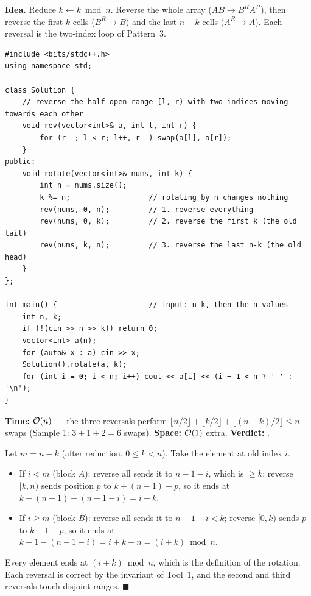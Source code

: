 \begin{algorithmbox}
\textbf{Idea.} Reduce $k \leftarrow k \bmod n$. Reverse the whole array ($AB \to B^R A^R$), then reverse the first $k$ cells ($B^R \to B$) and the last $n-k$ cells ($A^R \to A$). Each reversal is the two-index loop of Pattern~3.
\begin{lstlisting}[style=cpp]
#include <bits/stdc++.h>
using namespace std;

class Solution {
    // reverse the half-open range [l, r) with two indices moving towards each other
    void rev(vector<int>& a, int l, int r) {
        for (r--; l < r; l++, r--) swap(a[l], a[r]);
    }
public:
    void rotate(vector<int>& nums, int k) {
        int n = nums.size();
        k %= n;                  // rotating by n changes nothing
        rev(nums, 0, n);         // 1. reverse everything
        rev(nums, 0, k);         // 2. reverse the first k (the old tail)
        rev(nums, k, n);         // 3. reverse the last n-k (the old head)
    }
};

int main() {                     // input: n k, then the n values
    int n, k;
    if (!(cin >> n >> k)) return 0;
    vector<int> a(n);
    for (auto& x : a) cin >> x;
    Solution().rotate(a, k);
    for (int i = 0; i < n; i++) cout << a[i] << (i + 1 < n ? ' ' : '\n');
}
\end{lstlisting}
\begin{complexitybox}
\textbf{Time:} $\mathcal{O}(n)$ --- the three reversals perform $\lfloor n/2\rfloor + \lfloor k/2\rfloor + \lfloor (n-k)/2\rfloor \le n$ swaps (Sample 1: $3 + 1 + 2 = 6$ swaps). \textbf{Space:} $\mathcal{O}(1)$ extra. \textbf{Verdict:} \ac{}.
\end{complexitybox}
\end{algorithmbox}

\begin{invariantbox}
Let $m = n - k$ (after reduction, $0 \le k < n$). Take the element at old index $i$.
\begin{itemize}[leftmargin=*]
    \item If $i < m$ (block $A$): reverse all sends it to $n-1-i$, which is $\ge k$; reverse $[k, n)$ sends position $p$ to $k + (n-1) - p$, so it ends at $k + (n-1) - (n-1-i) = i + k$.
    \item If $i \ge m$ (block $B$): reverse all sends it to $n-1-i < k$; reverse $[0,k)$ sends $p$ to $k-1-p$, so it ends at $k-1-(n-1-i) = i + k - n = (i+k) \bmod n$.
\end{itemize}
Every element ends at $(i + k) \bmod n$, which is the definition of the rotation. Each reversal is correct by the invariant of Tool~1, and the second and third reversals touch disjoint ranges. \hfill$\blacksquare$
\end{invariantbox}

